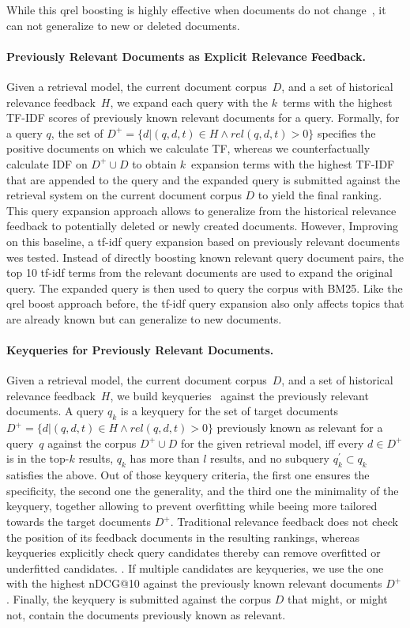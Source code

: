 While this qrel boosting is highly effective when documents do not change~\cite{alkhalifa:2024,keller:2024b}, it can not generalize to new or deleted documents.


\paragraph{Previously Relevant Documents as Explicit Relevance Feedback.} Given a retrieval model, the current document corpus~$D$, and a set of historical relevance feedback~$H$, we expand each query with the $k$~terms with the highest TF-IDF scores of previously known relevant documents for a query. Formally, for a query $q$, the set of $D^{+} = \{d| (q,d,t) \in H \wedge rel(q,d,t) > 0\}$ specifies the positive documents on which we calculate TF, whereas we counterfactually calculate IDF on $D^{+} \cup D$ to obtain $k$~expansion terms with the highest TF-IDF that are appended to the query and the expanded query is submitted against the retrieval system on the current document corpus $D$ to yield the final ranking. This query expansion approach allows to generalize from the historical relevance feedback to potentially deleted or newly created documents. However, 
Improving on this baseline, a tf-idf query expansion based on previously relevant documents wes tested. Instead of directly boosting known relevant query document pairs, the top 10 tf-idf terms from the relevant documents are used to expand the original query. The expanded query is then used to query the corpus with BM25. Like the qrel boost approach before, the tf-idf query expansion also only affects topics that are already known but can generalize to new documents.


\paragraph{Keyqueries for Previously Relevant Documents.} Given a retrieval model, the current document corpus~$D$, and a set of historical relevance feedback~$H$, we build keyqueries~\cite{froebe:2021c,gollub:2013a,hagen:2016b} against the previously relevant documents. A query $q_{k}$ is a keyquery for the set of target documents $D^{+} = \{d| (q,d,t) \in H \wedge rel(q,d,t) > 0\}$ previously known as relevant for a query~$q$ against the corpus $D^{+} \cup D$ for the given retrieval model, iff \Ni every $d \in D^{+}$ is in the top-$k$ results, \Nii $q_{k}$ has more than $l$ results, and \Niii no subquery $q^{'}_{k} \subset q_{k}$ satisfies the above. Out of those keyquery criteria, the first one ensures the specificity, the second one the generality, and the third one the minimality of the keyquery, together allowing to prevent overfitting while beeing more tailored towards the target documents $D^{+}$. Traditional relevance feedback does not check the position of its feedback documents in the resulting rankings, whereas keyqueries explicitly check query candidates thereby can remove overfitted or underfitted candidates. . If multiple candidates are keyqueries, we use the one with the highest nDCG@10 against the previously known relevant documents $D^{+}$. Finally, the keyquery is submitted against the corpus $D$ that might, or might not, contain the documents previously known as relevant.

